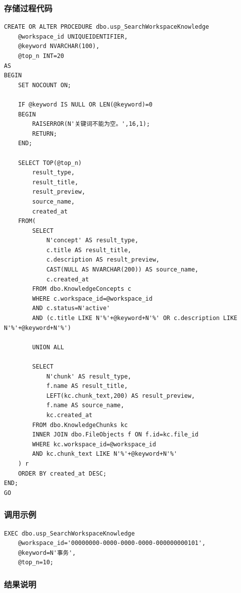 \documentclass[10pt,a4paper,fontset=none]{ctexart}
\begin{document}
\subsubsection*{存储过程代码}

\begin{Verbatim}[fontsize=\scriptsize,frame=single]
CREATE OR ALTER PROCEDURE dbo.usp_SearchWorkspaceKnowledge
    @workspace_id UNIQUEIDENTIFIER,
    @keyword NVARCHAR(100),
    @top_n INT=20
AS
BEGIN
    SET NOCOUNT ON;

    IF @keyword IS NULL OR LEN(@keyword)=0
    BEGIN
        RAISERROR(N'关键词不能为空。',16,1);
        RETURN;
    END;

    SELECT TOP(@top_n)
        result_type,
        result_title,
        result_preview,
        source_name,
        created_at
    FROM(
        SELECT
            N'concept' AS result_type,
            c.title AS result_title,
            c.description AS result_preview,
            CAST(NULL AS NVARCHAR(200)) AS source_name,
            c.created_at
        FROM dbo.KnowledgeConcepts c
        WHERE c.workspace_id=@workspace_id
        AND c.status=N'active'
        AND (c.title LIKE N'%'+@keyword+N'%' OR c.description LIKE N'%'+@keyword+N'%')

        UNION ALL

        SELECT
            N'chunk' AS result_type,
            f.name AS result_title,
            LEFT(kc.chunk_text,200) AS result_preview,
            f.name AS source_name,
            kc.created_at
        FROM dbo.KnowledgeChunks kc
        INNER JOIN dbo.FileObjects f ON f.id=kc.file_id
        WHERE kc.workspace_id=@workspace_id
        AND kc.chunk_text LIKE N'%'+@keyword+N'%'
    ) r
    ORDER BY created_at DESC;
END;
GO
\end{Verbatim}

\subsubsection*{调用示例}

\begin{Verbatim}[fontsize=\scriptsize,frame=single]
EXEC dbo.usp_SearchWorkspaceKnowledge
    @workspace_id='00000000-0000-0000-0000-000000000101',
    @keyword=N'事务',
    @top_n=10;
\end{Verbatim}

\subsubsection*{结果说明}
\end{document}
